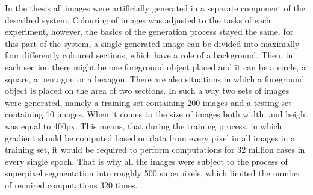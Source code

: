 In the thesis all images were artificially generated in a separate component of the described system. Colouring of images was adjusted to the tasks of each experiment, however, the basics of the generation process stayed the same. for this part of the system, a single generated image can be divided into maximally four differently coloured sections, which have a role of a background. Then, in each section there might be one foreground object placed and it can be a circle, a square, a pentagon or a hexagon. There are also situations in which a foreground object is placed on the area of two sections. In such a way two sets of images were generated, namely a training set containing 200 images and a testing set containing 10 images. When it comes to the size of images both width, and height was equal to 400px. This means, that during the training process, in which gradient should be computed based on data from every pixel in all images in a training set, it would be required to perform computations for 32 million cases in every single epoch. That is why all the images were subject to the process of superpixel segmentation into roughly 500 superpixels, which limited the number of required computations 320 times. 

